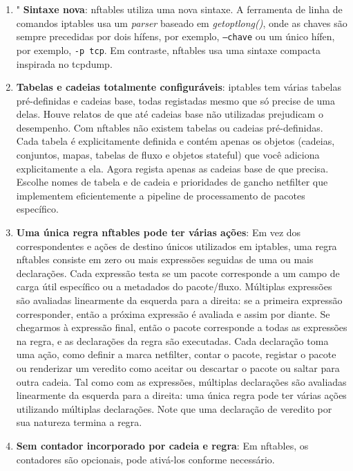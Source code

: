 \begin{enumerate}

\item " \textbf{Sintaxe nova}: nftables utiliza uma nova sintaxe. A ferramenta de 
linha de comandos iptables usa um \textit{parser} baseado em \textit{getoptlong()}, onde as 
chaves são sempre precedidas por dois hífens, por exemplo, \texttt{--chave} ou 
um único hífen, por exemplo, \texttt{-p tcp}. Em contraste, nftables usa uma 
sintaxe compacta inspirada no tcpdump.

\item \textbf{Tabelas e cadeias totalmente configuráveis}: iptables tem várias 
tabelas pré-definidas e cadeias base, todas registadas mesmo que só precise de uma 
delas. Houve relatos de que até cadeias base não utilizadas prejudicam o desempenho. 
Com nftables não existem tabelas ou cadeias pré-definidas. Cada tabela é explicitamente 
definida e contém apenas os objetos (cadeias, conjuntos, mapas, tabelas de fluxo e 
objetos stateful) que você adiciona explicitamente a ela. Agora regista apenas as 
cadeias base de que precisa. Escolhe nomes de tabela e de cadeia e prioridades de 
gancho netfilter que implementem eficientemente a pipeline de processamento de 
pacotes específico.

\item \textbf{Uma única regra nftables pode ter várias ações}: Em vez dos correspondentes 
e ações de destino únicos utilizados em iptables, uma regra nftables consiste em zero 
ou mais expressões seguidas de uma ou mais declarações. Cada expressão testa se um pacote 
corresponde a um campo de carga útil específico ou a metadados do pacote/fluxo. Múltiplas 
expressões são avaliadas linearmente da esquerda para a direita: se a primeira expressão 
corresponder, então a próxima expressão é avaliada e assim por diante. Se chegarmos à 
expressão final, então o pacote corresponde a todas as expressões na regra, e as 
declarações da regra são executadas. Cada declaração toma uma ação, como definir 
a marca netfilter, contar o pacote, registar o pacote ou renderizar um veredito 
como aceitar ou descartar o pacote ou saltar para outra cadeia. Tal como com as 
expressões, múltiplas declarações são avaliadas linearmente da esquerda para a 
direita: uma única regra pode ter várias ações utilizando múltiplas declarações. 
Note que uma declaração de veredito por sua natureza termina a regra.

\item \textbf{Sem contador incorporado por cadeia e regra}: Em nftables, os contadores 
são opcionais, pode ativá-los conforme necessário.


\end{enumerate}
